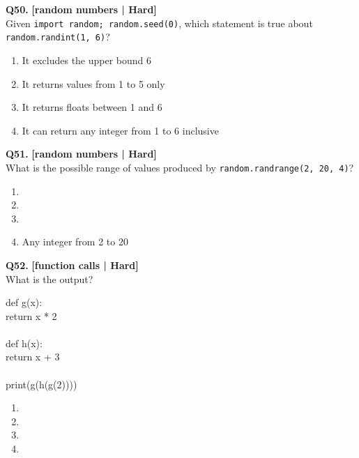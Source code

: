 \noindent\textbf{Q50.} \hfill {\small\color{LPUOrange}\textbf{[random numbers | Hard]}}\\[2pt]
Given \texttt{import random; random.seed(0)}, which statement is true about \texttt{random.randint(1, 6)}?

\begin{enumerate}[label=(\alph*),topsep=2pt,itemsep=1pt,partopsep=0pt,parsep=0pt]
    \item \relax It excludes the upper bound 6
    \item \relax It returns values from 1 to 5 only
    \item \relax It returns floats between 1 and 6
    \item \relax It can return any integer from 1 to 6 inclusive
\end{enumerate}
\vspace{2mm}

\noindent\textbf{Q51.} \hfill {\small\color{LPUOrange}\textbf{[random numbers | Hard]}}\\[2pt]
What is the possible range of values produced by \texttt{random.randrange(2, 20, 4)}?

\begin{enumerate}[label=(\alph*),topsep=2pt,itemsep=1pt,partopsep=0pt,parsep=0pt]
    \item {}
    \item {}
    \item {}
    \item \relax Any integer from 2 to 20
\end{enumerate}
\vspace{2mm}

\noindent\textbf{Q52.} \hfill {\small\color{LPUOrange}\textbf{[function calls | Hard]}}\\[2pt]
What is the output? 

\begin{pycode}
def g(x):\\
return x * 2\\
~\\
def h(x):\\
return x + 3\\
~\\
print(g(h(g(2))))
\end{pycode}

\begin{enumerate}[label=(\alph*),topsep=2pt,itemsep=1pt,partopsep=0pt,parsep=0pt]
    \item {}
    \item {}
    \item {}
    \item {}
\end{enumerate}
\vspace{2mm}

